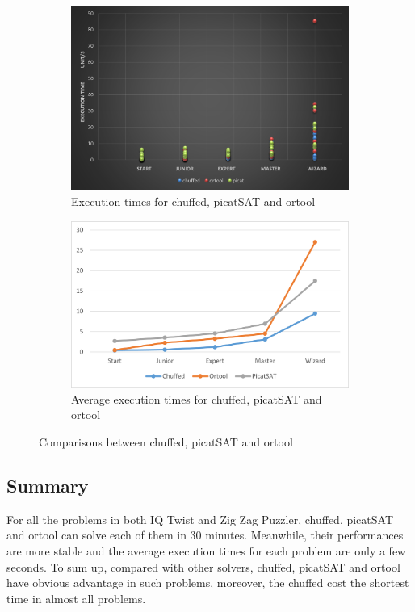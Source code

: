 \begin{figure}[H]
\begin{subfigure}[b]{0.48\textwidth}
  \centering
    \includegraphics[width=\textwidth]{figs/time2three.png}
    \caption{Execution times for chuffed, picatSAT and ortool}
    \label{fig:compare}
\end{subfigure}
\begin{subfigure}[b]{0.48\textwidth}
 \centering
    \includegraphics[width=\textwidth]{figs/Threecomparison2.png}
    \caption{Average execution times for chuffed, picatSAT and ortool}
    \label{fig:compare}
\end{subfigure}
\caption{Comparisons between  chuffed, picatSAT and ortool}
\label{fig:comparisonlast}
\end{figure}
\subsection{Summary}
\label{sec:Summary}
For all the problems in both IQ Twist and Zig Zag Puzzler, chuffed, picatSAT and ortool can solve each of them in 30 minutes. Meanwhile, their performances are more stable and the average execution times for each problem are only a few seconds. To sum up, compared with other solvers, chuffed, picatSAT and ortool have obvious advantage in such problems, moreover, the chuffed cost the shortest time in almost all problems. 
 